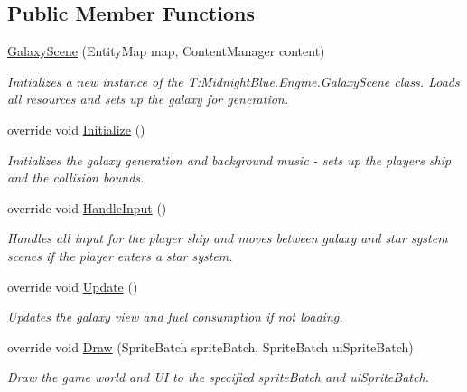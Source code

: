 \subsection*{Public Member Functions}
\begin{DoxyCompactItemize}
\item 
\hyperlink{class_midnight_blue_1_1_galaxy_scene_acdd82e3464ea18ca77bcf4694e9803a5}{Galaxy\+Scene} (Entity\+Map map, Content\+Manager content)
\begin{DoxyCompactList}\small\item\em Initializes a new instance of the T\+:\+Midnight\+Blue.\+Engine.\+Galaxy\+Scene class. Loads all resources and sets up the galaxy for generation. \end{DoxyCompactList}\item 
override void \hyperlink{class_midnight_blue_1_1_galaxy_scene_a97d97e56a73d9a4b7caf6dd6ce86647e}{Initialize} ()
\begin{DoxyCompactList}\small\item\em Initializes the galaxy generation and background music -\/ sets up the players ship and the collision bounds. \end{DoxyCompactList}\item 
override void \hyperlink{class_midnight_blue_1_1_galaxy_scene_afd7f8c9f6d0cf6ded10299d4b0015c29}{Handle\+Input} ()
\begin{DoxyCompactList}\small\item\em Handles all input for the player ship and moves between galaxy and star system scenes if the player enters a star system. \end{DoxyCompactList}\item 
override void \hyperlink{class_midnight_blue_1_1_galaxy_scene_a9dfa66406143ed20f4d534c768f05a78}{Update} ()
\begin{DoxyCompactList}\small\item\em Updates the galaxy view and fuel consumption if not loading. \end{DoxyCompactList}\item 
override void \hyperlink{class_midnight_blue_1_1_galaxy_scene_a3646fcf97e067bac267d42aad66e71c4}{Draw} (Sprite\+Batch sprite\+Batch, Sprite\+Batch ui\+Sprite\+Batch)
\begin{DoxyCompactList}\small\item\em Draw the game world and UI to the specified sprite\+Batch and ui\+Sprite\+Batch. \end{DoxyCompactList}\item 

\end{DoxyCompactItemize}

